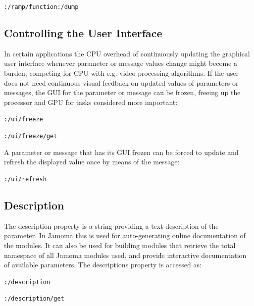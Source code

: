 \documentclass{NIME-alternate}
\begin{document}
\texttt{:/ramp/function:/dump}





\subsection{Controlling the User Interface} %
\label{sub:controlling_the_user_interface}

In certain applications the CPU overhead of continuously updating the graphical user interface whenever parameter or message values change might become a burden, competing for CPU with e.g. video processing algorithms. If the user does not need continuous visual feedback on updated values of parameters or messages, the GUI for the parameter or message can be frozen, freeing up the processor and GPU for tasks considered more important:

\texttt{:/ui/freeze}

\texttt{:/ui/freeze/get}

A parameter or message that has its GUI frozen can be forced to update and refresh the displayed value once by means of the message:

\texttt{:/ui/refresh}






\subsection{Description} %
\label{sub:description}

The description property is a string providing a text description of the parameter. In Jamoma this is used for auto-generating online documentation of the modules. It can also be used for building modules that retrieve the total namespace of all Jamoma modules used, and provide interactive documentation of available parameters. The descriptions property is accessed as:

\texttt{:/description}

\texttt{:/description/get}



\end{document}
